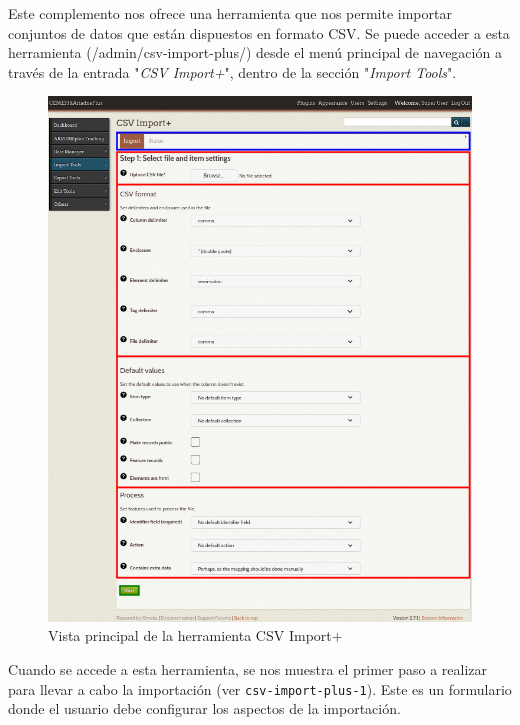 \documentclass[
]{article}
\begin{document}
Este complemento nos ofrece una herramienta que nos permite importar
conjuntos de datos que están dispuestos en formato CSV. Se puede acceder
a esta herramienta ({/admin/csv-import-plus/}) desde el menú principal
de navegación a través de la entrada "\emph{CSV Import+}", dentro de la
sección "\emph{Import Tools}".

\begin{figure}
\hypertarget{csv-import-plus-1}{%
\centering
\includegraphics{../_static/images/csv-import-plus-1.png}
\caption{Vista principal de la herramienta CSV
Import+}\label{csv-import-plus-1}
}
\end{figure}

Cuando se accede a esta herramienta, se nos muestra el primer paso a
realizar para llevar a cabo la importación (ver
\texttt{csv-import-plus-1}). Este es un formulario donde el usuario debe
configurar los aspectos de la importación.
\end{document}
